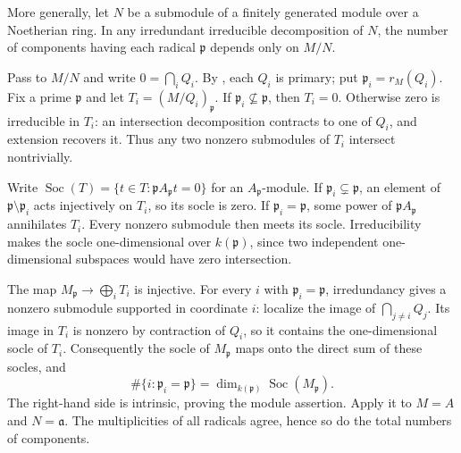 More generally, let $N$ be a submodule of a finitely generated module over a Noetherian ring. In any irredundant irreducible decomposition of $N$, the number of components having each radical $\mathfrak{p}$ depends only on $M/N$.

Pass to $M/N$ and write $0=\bigcap_iQ_i$. By , each $Q_i$ is primary; put $\mathfrak{p}_i=r_M(Q_i)$. Fix a prime $\mathfrak{p}$ and let $T_i=(M/Q_i)_{\mathfrak{p}}$. If $\mathfrak{p}_i\not\subseteq\mathfrak{p}$, then $T_i=0$. Otherwise zero is irreducible in $T_i$: an intersection decomposition contracts to one of $Q_i$, and extension recovers it. Thus any two nonzero submodules of $T_i$ intersect nontrivially.

Write $\operatorname{Soc}(T)=\{t\in T:\mathfrak{p}A_{\mathfrak{p}}t=0\}$ for an $A_{\mathfrak{p}}$-module. If $\mathfrak{p}_i\subsetneq\mathfrak{p}$, an element of $\mathfrak{p}\setminus\mathfrak{p}_i$ acts injectively on $T_i$, so its socle is zero. If $\mathfrak{p}_i=\mathfrak{p}$, some power of $\mathfrak{p}A_{\mathfrak{p}}$ annihilates $T_i$. Every nonzero submodule then meets its socle. Irreducibility makes the socle one-dimensional over $k(\mathfrak{p})$, since two independent one-dimensional subspaces would have zero intersection.

The map $M_{\mathfrak{p}}\to\bigoplus_iT_i$ is injective. For every $i$ with $\mathfrak{p}_i=\mathfrak{p}$, irredundancy gives a nonzero submodule supported in coordinate $i$: localize the image of $\bigcap_{j\ne i}Q_j$. Its image in $T_i$ is nonzero by contraction of $Q_i$, so it contains the one-dimensional socle of $T_i$. Consequently the socle of $M_{\mathfrak{p}}$ maps onto the direct sum of these socles, and
\[\#\{i:\mathfrak{p}_i=\mathfrak{p}\}=\dim_{k(\mathfrak{p})}\operatorname{Soc}(M_{\mathfrak{p}}).\]
The right-hand side is intrinsic, proving the module assertion. Apply it to $M=A$ and $N=\mathfrak{a}$. The multiplicities of all radicals agree, hence so do the total numbers of components.
